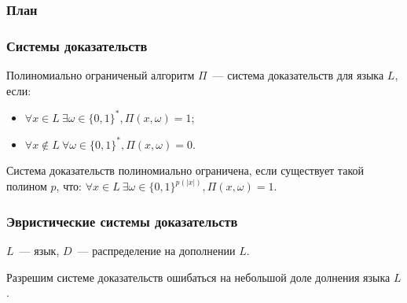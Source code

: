 \begin{frame}
    \frametitle{План}
\end{frame}

\begin{frame}
	\frametitle{Системы доказательств}

    \begin{definition}
        Полиномиально ограниченый алгоритм $\Pi$~--- система доказательств для языка
        $L$, если:
        \begin{itemize}
            \item $\forall x \in L~ \exists \omega \in \{0, 1\}^{*}, \Pi(x, \omega) = 1$;
        	\item $\forall x \notin L~ \forall \omega \in \{0, 1\}^{*}, 
        		\Pi(x, \omega) = 0$.
        \end{itemize}
    \end{definition}

    Система доказательств полиномиально ограничена, если существует такой полином
    $p$, что:
    $\forall x \in L~ \exists \omega \in \{0, 1\}^{p(|x|)}, \Pi(x, \omega) = 1$.
\end{frame}

\begin{frame}
    \frametitle{Эвристические системы доказательств}

    $L$~--- язык, $D$~--- распределение на дополнении $L$.

    Разрешим системе доказательств ошибаться на небольшой доле долнения языка $L$.

    
    


\end{frame}


